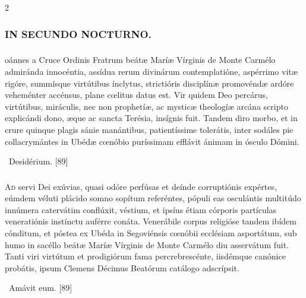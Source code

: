\documentclass[9pt,twoside]{extarticle}
\begin{document}
\begin{multicols}{2}
{\subsubsection*{\center \textsc{IN SECUNDO NOCTURNO.}}
\subsubsection*{\center {}}
oánnes a Cruce Ordinis Fratrum beátæ Maríæ Vírginis de Monte Carmélo admiránda innocéntia, assídua rerum divinárum contemplatióne, aspérrimo vitæ rigóre, summísque virtútibus ínclytus, strictióris disciplínæ promovéndæ ardóre veheménter accénsus, plane cœlitus datus est. Vir quidem Deo percárus, virtútibus, miráculis, nec non prophetíæ, ac mysticæ theologíæ arcána scripto explicándi dono, æque ac sancta Terésia, insígnis fuit. Tandem diro morbo, et in crure quinque plagis sánie manántibus, patientíssime tolerátis, inter sodáles pie collacrymántes in Ubédæ cœnóbio puríssimam efflávit ánimam in ósculo Dómini.

\begin{tightlist}{}
\item {}~Desidérium. [89]
\end{tightlist}

\subsubsection*{\center {}}
\lettrine{A}d servi Dei exúvias, quasi odóre perfúsas et deínde corruptiónis expértes, eúmdem véluti plácido somno sopítum referéntes, pópuli eas osculántis multitúdo innúmera catervátim conflúxit, véstium, et ipsíus étiam córporis partículas veneratiónis instínctu auférre conáta. Venerábile corpus religióse tandem ibídem cónditum, et póstea ex Ubéda in Segoviénsis cœnóbii ecclésiam asportátum, sub humo in sacéllo beátæ Maríæ Vírginis de Monte Carmélo diu asservátum fuit. Tanti viri virtútum et prodigiórum fama percrebrescénte, iisdémque canónice probátis, ipsum Clemens Décimus Beatórum catálogo adscrípsit.

\begin{tightlist}{}
\item {}~Amávit eum. [89]
\end{tightlist}

}
\end{multicols}
\end{document}
